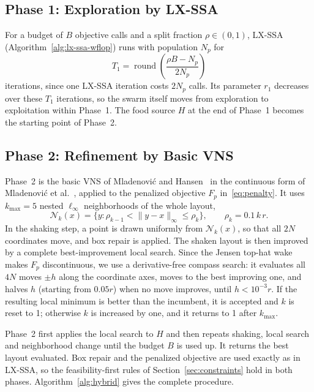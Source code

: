 \documentclass[journal,twoside]{IEEEtran}
\begin{document}
\subsection{Phase 1: Exploration by LX-SSA}
For a budget of $B$ objective calls and a split fraction $\rho\in(0,1)$, LX-SSA (Algorithm~\ref{alg:lx-ssa-wflop}) runs with population $N_p$ for
\[
T_1=\operatorname{round}\!\left(\frac{\rho B-N_p}{2N_p}\right)
\]
iterations, since one LX-SSA iteration costs $2N_p$ calls. Its parameter $r_1$ decreases over these $T_1$ iterations, so the swarm itself moves from exploration to exploitation within Phase~1. The food source $H$ at the end of Phase~1 becomes the starting point of Phase~2.

\subsection{Phase 2: Refinement by Basic VNS}
Phase~2 is the basic VNS of Mladenovi\'c and Hansen~\cite{Mladenovic1997,Hansen2001} in the continuous form of Mladenovi\'c et al.~\cite{Mladenovic2008}, applied to the penalized objective $F_p$ in~\eqref{eq:penalty}. It uses $k_{\max}=5$ nested $\ell_\infty$ neighborhoods of the whole layout,
\[
\mathcal N_k(x)=\{y:\rho_{k-1}<\lVert y-x\rVert_\infty\le\rho_k\},\qquad \rho_k=0.1\,k\,r .
\]
In the shaking step, a point is drawn uniformly from $\mathcal N_k(x)$, so that all $2N$ coordinates move, and box repair is applied. The shaken layout is then improved by a complete best-improvement local search. Since the Jensen top-hat wake makes $F_p$ discontinuous, we use a derivative-free compass search: it evaluates all $4N$ moves $\pm h$ along the coordinate axes, moves to the best improving one, and halves $h$ (starting from $0.05r$) when no move improves, until $h<10^{-3}r$. If the resulting local minimum is better than the incumbent, it is accepted and $k$ is reset to 1; otherwise $k$ is increased by one, and it returns to 1 after $k_{\max}$.

Phase~2 first applies the local search to $H$ and then repeats shaking, local search and neighborhood change until the budget $B$ is used up. It returns the best layout evaluated. Box repair and the penalized objective are used exactly as in LX-SSA, so the feasibility-first rules of Section~\ref{sec:constraints} hold in both phases. Algorithm~\ref{alg:hybrid} gives the complete procedure.
\end{document}
